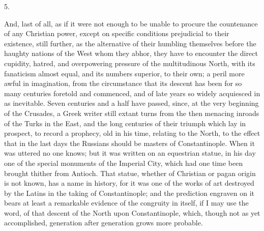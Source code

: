 5.

And, last of all, as if it
were not enough to be unable to procure the countenance of any
Christian power, except on specific conditions prejudicial to their
existence, still further, as the alternative of their humbling
themselves before the haughty nations of the West whom they abhor,
they have to encounter the direct cupidity, hatred, and overpowering
pressure of the multitudinous North, with its fanaticism almost equal,
and its numbers superior, to their own; a peril more awful in
imagination, from the circumstance that its descent has been for so
many centuries foretold and commenced, and of late years so widely
acquiesced in as inevitable. Seven centuries and a half have passed,
since, at the very beginning of the Crusades, a Greek writer
still extant turns from the then menacing inroads of the Turks in the
East, and the long centuries of their triumph which lay in prospect,
to record a prophecy, old in his time, relating to the North, to the
effect that in the last days the Russians should be masters of
Constantinople. When it was uttered no one knows; but it was written
on an equestrian statue, in his day one of the special monuments of
the Imperial City, which had one time been brought thither from
Antioch. That statue, whether of Christian or pagan origin is not
known, has a name in history, for it was one of the works of art
destroyed by the Latins in the taking of Constantinople; and the
prediction engraven on it bears at least a remarkable evidence of the
congruity in itself, if I may use the word, of that descent of the
North upon Constantinople, which, though not as yet accomplished,
generation after generation grows more probable.

